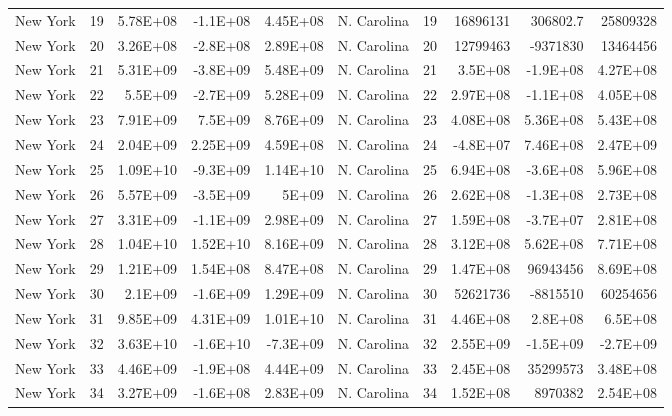 \begin{landscape}
\begin{singlespace}
\begin{longtable}{lrrrr|lrrrr}
		New York &  19 & 5.78E+08 & -1.1E+08 & 4.45E+08 & N. Carolina &  19 & 16896131 & 306802.7 & 25809328 \\
		New York &  20 & 3.26E+08 & -2.8E+08 & 2.89E+08 & N. Carolina &  20 & 12799463 & -9371830 & 13464456 \\
		New York &  21 & 5.31E+09 & -3.8E+09 & 5.48E+09 & N. Carolina &  21 & 3.5E+08 & -1.9E+08 & 4.27E+08 \\
		New York &  22 & 5.5E+09 & -2.7E+09 & 5.28E+09 & N. Carolina &  22 & 2.97E+08 & -1.1E+08 & 4.05E+08 \\
		New York &  23 & 7.91E+09 & 7.5E+09 & 8.76E+09 & N. Carolina &  23 & 4.08E+08 & 5.36E+08 & 5.43E+08 \\
		New York &  24 & 2.04E+09 & 2.25E+09 & 4.59E+08 & N. Carolina &  24 & -4.8E+07 & 7.46E+08 & 2.47E+09 \\
		New York &  25 & 1.09E+10 & -9.3E+09 & 1.14E+10 & N. Carolina &  25 & 6.94E+08 & -3.6E+08 & 5.96E+08 \\
		New York &  26 & 5.57E+09 & -3.5E+09 & 5E+09 & N. Carolina &  26 & 2.62E+08 & -1.3E+08 & 2.73E+08 \\
		New York &  27 & 3.31E+09 & -1.1E+09 & 2.98E+09 & N. Carolina &  27 & 1.59E+08 & -3.7E+07 & 2.81E+08 \\
		New York &  28 & 1.04E+10 & 1.52E+10 & 8.16E+09 & N. Carolina &  28 & 3.12E+08 & 5.62E+08 & 7.71E+08 \\
		New York &  29 & 1.21E+09 & 1.54E+08 & 8.47E+08 & N. Carolina &  29 & 1.47E+08 & 96943456 & 8.69E+08 \\
		New York &  30 & 2.1E+09 & -1.6E+09 & 1.29E+09 & N. Carolina &  30 & 52621736 & -8815510 & 60254656 \\
		New York &  31 & 9.85E+09 & 4.31E+09 & 1.01E+10 & N. Carolina &  31 & 4.46E+08 & 2.8E+08 & 6.5E+08 \\
		New York &  32 & 3.63E+10 & -1.6E+10 & -7.3E+09 & N. Carolina &  32 & 2.55E+09 & -1.5E+09 & -2.7E+09 \\
		New York &  33 & 4.46E+09 & -1.9E+08 & 4.44E+09 & N. Carolina &  33 & 2.45E+08 & 35299573 & 3.48E+08 \\
		New York &  34 & 3.27E+09 & -1.6E+08 & 2.83E+09 & N. Carolina &  34 & 1.52E+08 & 8970382 & 2.54E+08\\


\end{longtable}
\end{singlespace}
\end{landscape}
